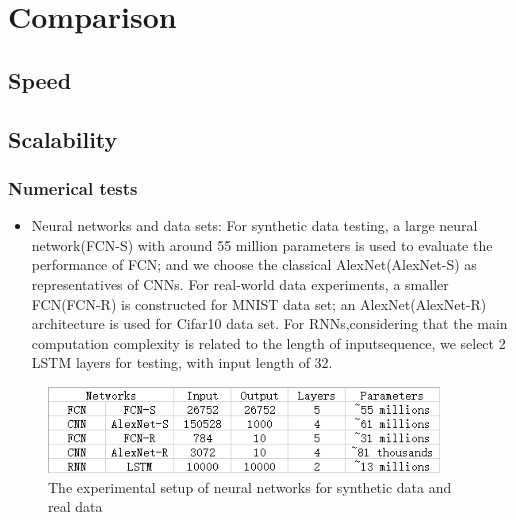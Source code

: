 
\section{Comparison}\label{sec:numer}

\subsection{Speed}

\subsection{Scalability}

\begin{frame}
  \MyLogo
  \frametitle{Numerical tests}  
		\begin{itemize}
		\item Neural networks and data sets:
		For synthetic data testing, a large neural network(FCN-S) with around 55 million parameters is used to evaluate the performance of FCN; and we choose the classical AlexNet(AlexNet-S) as representatives of CNNs. For real-world data experiments, a smaller FCN(FCN-R) is constructed for MNIST data set; an AlexNet(AlexNet-R) architecture is used for Cifar10 data set. For RNNs,considering that the main computation complexity is related to the length of inputsequence, we select 2 LSTM layers for testing, with input length of 32.
		\end{itemize}
		\begin{figure}[htbp] 
			\includegraphics[height=0.9in]{figures/models.png} 
			\caption{The experimental setup of neural networks for synthetic data and real data}
		\end{figure}
	
\end{frame}

%

